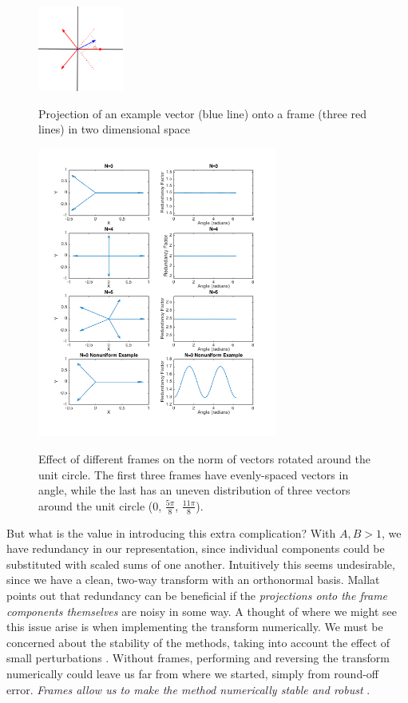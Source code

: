 \documentclass[letterpaper]{article}
\begin{document}
\begin{figure}[h!]
  \caption{Projection of an example vector (blue line) onto a frame (three red lines) in two dimensional space}
  \centering
    \includegraphics[width=0.25\textwidth]{figures/frames2dproj}
  \label{fig:frames2dproj}
\end{figure}

\begin{figure}[h]
  \caption{Effect of different frames on the norm of vectors rotated around the unit circle.
The first three frames have evenly-spaced vectors in angle,
while the last has an uneven distribution of three vectors around the unit circle (0, $\frac{5 \pi}{8}$, $\frac{11 \pi}{8}$).}
  \centering
    \includegraphics[width=0.7\textwidth]{figures/framesnorm}
  \label{fig:framesnorm}
\end{figure}

But what is the value in introducing this extra complication?
With \( A,B > 1 \), we have redundancy in our representation, since individual components could be substituted with scaled sums of one another. 
Intuitively this seems undesirable, since we have a clean, two-way transform with an orthonormal basis.
Mallat points out that redundancy can be beneficial if the \emph{projections onto the frame components themselves} are noisy in some way.
A thought of where we might see this issue arise is when implementing the transform numerically.
We must be concerned about the stability of the methods,
taking into account the effect of small perturbations \cite[p.~55]{daub}.
Without frames, performing and reversing the transform numerically could leave us far from where we started,
simply from round-off error.
\emph{Frames allow us to make the method numerically stable and robust} \cite[p.~56,~p.~98]{daub}.
\end{document}
